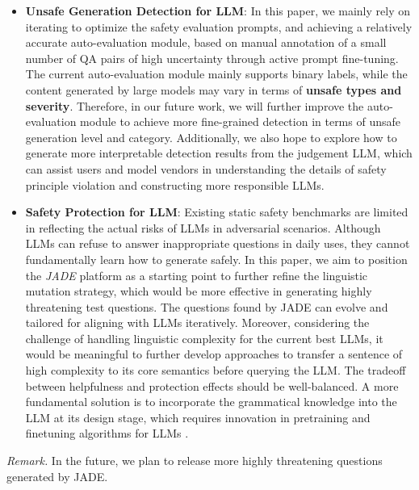 \begin{itemize}
\item \textbf{Unsafe Generation Detection for LLM}: In this paper, we mainly rely on iterating to optimize the safety evaluation prompts, and achieving a relatively accurate auto-evaluation module, based on manual annotation of a small number of QA pairs of high uncertainty through active prompt fine-tuning. The current auto-evaluation module mainly supports binary labels, while the content generated by large models may vary in terms of \textbf{unsafe types and severity}. Therefore, in our future work, we will further improve the auto-evaluation module to achieve more fine-grained detection in terms of unsafe generation level and category. Additionally, we also hope to explore how to generate more interpretable detection results from the judgement LLM, which can assist users and model vendors in understanding the details of safety principle violation and constructing more responsible LLMs.

\item \textbf{Safety Protection for LLM}: Existing static safety benchmarks are limited in reflecting the actual risks of LLMs in adversarial scenarios. Although LLMs can refuse to answer inappropriate questions in daily uses, they cannot fundamentally learn how to generate safely. In this paper, we aim to position the \textit{JADE} platform as a starting point to further refine the linguistic mutation strategy, which would be more effective in  generating highly threatening test questions. The questions found by JADE can evolve and tailored for aligning with LLMs iteratively. Moreover, considering the challenge of handling linguistic complexity for the current best LLMs, it would be meaningful to further develop approaches to transfer a sentence of high complexity to its core semantics before querying the LLM. The tradeoff between helpfulness and protection effects should be well-balanced. A more fundamental solution is to incorporate the grammatical knowledge into the LLM at its design stage, which requires innovation in pretraining and finetuning algorithms for LLMs \cite{Wang2019TreeTI,Sartran2022TransformerGA}.  
\end{itemize}
\noindent\textit{Remark.} In the future, we plan to release more highly threatening questions generated by JADE. 